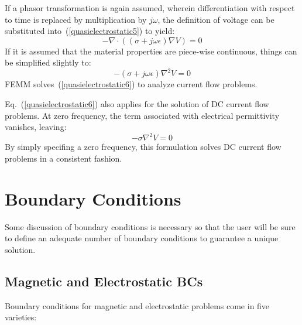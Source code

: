 \documentclass[12pt]{report}
\begin{document}
If a phasor transformation is again assumed, wherein differentiation with respect to time
is replaced by multiplication by $j \omega$, the definition of voltage can be substituted
into~(\ref{quasielectrostatic5}) to yield:
\begin{equation}
- \nabla \cdot \left( \left( \sigma + j \omega \epsilon \right) \nabla V \right) = 0
\end{equation}
If it is assumed that the material properties are piece-wise continuous, things can be
simplified slightly to:
\begin{equation}
\label{quasielectrostatic6}
- \left( \sigma + j \omega \epsilon \right) \nabla^2 V = 0
\end{equation}
FEMM solves~(\ref{quasielectrostatic6}) to analyze current flow problems.

Eq.~(\ref{quasielectrostatic6}) also applies for the solution of DC current flow problems.
At zero frequency, the term associated with electrical permittivity vanishes, leaving:
\begin{equation}
\label{quasielectrostatic7}
- \sigma \nabla^2 V = 0
\end{equation}
By simply specifing a zero frequency, this formulation solves DC current flow problems
in a consistent fashion.


\section{Boundary Conditions} \label{bcsection}

Some discussion of boundary conditions is necessary so that the
user will be sure to define an adequate number of boundary
conditions to guarantee a unique solution.  

\subsection{Magnetic and Electrostatic BCs}

Boundary conditions for magnetic and electrostatic problems come in five varieties:
\end{document}
